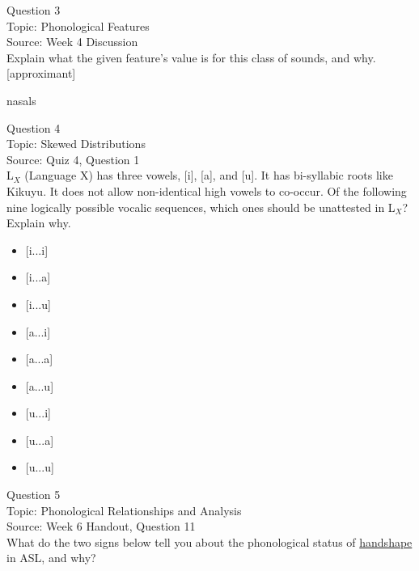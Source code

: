 \documentclass[12pt]{article}
\begin{document}
\newpage

{\large Question 3}\\

Topic: Phonological Features\\
Source: Week 4 Discussion\\

Explain what the given feature’s value is for this class of sounds, and why.\\

{[approximant]}

nasals


\newpage

{\large Question 4}\\

Topic: Skewed Distributions\\
Source: Quiz 4, Question 1\\

L$_X$ (Language X) has three vowels, [i], [a], and [u]. It has bi-syllabic roots like Kikuyu. It does not allow non-identical high vowels to co-occur. Of the following nine logically possible vocalic sequences, which ones should be unattested in L$_X$? Explain why.\\

\begin{itemize} \item {[i...i]} \item {[i...a]} \item {[i...u]} \item {[a...i]} \item {[a...a]} \item {[a...u]} \item {[u...i]} \item {[u...a]} \item {[u...u]} \end{itemize}


\newpage

{\large Question 5}\\

Topic: Phonological Relationships and Analysis\\
Source: Week 6 Handout, Question 11\\

What do the two signs below tell you about the phonological status of \underline{handshape} in ASL, and why?\\
\end{document}
